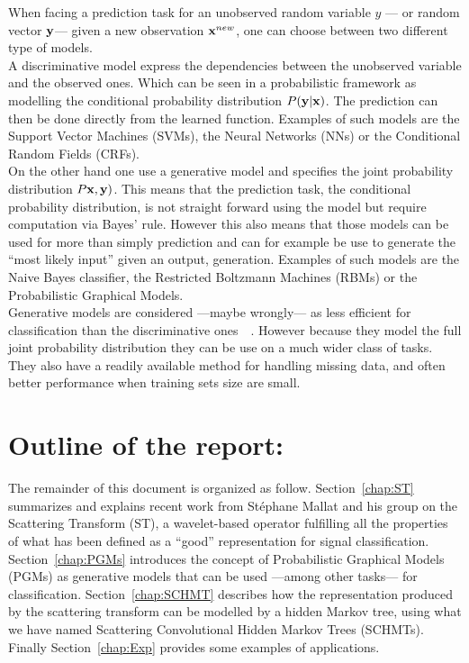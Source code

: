\documentclass[a4paper,11pt]{report}
\begin{document}
		When facing a prediction task for an unobserved random variable $y$ --- or random vector ${\bf y}$--- given a new observation ${\bf x}^{new}$, one can choose between two different type of models.\\
		
		A discriminative model express the dependencies between the unobserved variable and the observed ones. Which can be seen in a probabilistic framework as modelling the conditional probability distribution $P({\bf y}|{\bf x})$. The prediction can then be done directly from the learned function. Examples of such models are the Support Vector Machines (SVMs), the Neural Networks (NNs) or the Conditional Random Fields (CRFs).\\
		
		On the other hand one use a generative model and specifies the joint probability distribution $P{\bf x},{\bf y})$. This means that the prediction task, \ie the conditional probability distribution, is not straight forward using the model but require computation via Bayes' rule. However this also means that those models can be used for more than simply prediction and can for example be use to generate the ``most likely input'' given an output, \ie generation. Examples of such models are the Naive Bayes classifier, the Restricted Boltzmann Machines (RBMs) or the Probabilistic Graphical Models.\\
		
		Generative models are considered ---maybe wrongly--- as less efficient for classification than the discriminative ones~\citep{ulusoy2005generative}~\citep{jordan2002discriminative}. However because they model the full joint probability distribution they can be use on a much wider class of tasks. They also have a readily available method for handling missing data, and often better performance when training sets size are small.
		
	\section{Outline of the report:}
    \label{sec:Intro/Outline of the report}    
    
    The remainder of this document is organized as follow. Section~\ref{chap:ST} summarizes and explains recent work from St\'ephane Mallat and his group on the Scattering Transform (ST), a wavelet-based operator fulfilling all the properties of what has been defined as a ``good'' representation for signal classification. Section~\ref{chap:PGMs} introduces the concept of Probabilistic Graphical Models (PGMs) as generative models that can be used ---among other tasks--- for classification. Section~\ref{chap:SCHMT} describes how the representation produced by the scattering transform can be modelled by a hidden Markov tree, using what we have named Scattering Convolutional Hidden Markov Trees (SCHMTs). Finally Section~\ref{chap:Exp} provides some examples of applications.
        
\end{document}
